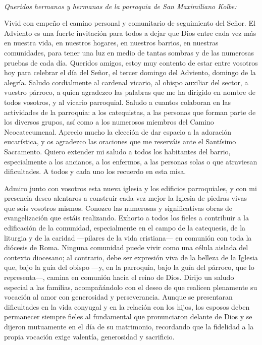 ~

\emph{Queridos hermanos y hermanas de la parroquia de San Maximiliano Kolbe:}

Vivid con empeño el camino personal y comunitario de seguimiento del Señor. El Adviento es una fuerte invitación para todos a dejar que Dios entre cada vez más en nuestra vida, en nuestros hogares, en nuestros barrios, en nuestras comunidades, para tener una luz en medio de tantas sombras y de las numerosas pruebas de cada día. Queridos amigos, estoy muy contento de estar entre vosotros hoy para celebrar el día del Señor, el tercer domingo del Adviento, domingo de la alegría. Saludo cordialmente al cardenal vicario, al obispo auxiliar del sector, a vuestro párroco, a quien agradezco las palabras que me ha dirigido en nombre de todos vosotros, y al vicario parroquial. Saludo a cuantos colaboran en las actividades de la parroquia: a los catequistas, a las personas que forman parte de los diversos grupos, así como a los numerosos miembros del Camino Neocatecumenal. Aprecio mucho la elección de dar espacio a la adoración eucarística, y os agradezco las oraciones que me reserváis ante el Santísimo Sacramento. Quiero extender mi saludo a todos los habitantes del barrio, especialmente a los ancianos, a los enfermos, a las personas solas o que atraviesan dificultades. A todos y cada uno los recuerdo en esta misa.

Admiro junto con vosotros esta nueva iglesia y los edificios parroquiales, y con mi presencia deseo alentaros a construir cada vez mejor la Iglesia de piedras vivas que sois vosotros mismos. Conozco las numerosas y significativas obras de evangelización que estáis realizando. Exhorto a todos los fieles a contribuir a la edificación de la comunidad, especialmente en el campo de la catequesis, de la liturgia y de la caridad ---pilares de la vida cristiana--- en comunión con toda la diócesis de Roma. Ninguna comunidad puede vivir como una célula aislada del contexto diocesano; al contrario, debe ser expresión viva de la belleza de la Iglesia que, bajo la guía del obispo ---y, en la parroquia, bajo la guía del párroco, que lo representa---, camina en comunión hacia el reino de Dios. Dirijo un saludo especial a las familias, acompañándolo con el deseo de que realicen plenamente su vocación al amor con generosidad y perseverancia. Aunque se presentaran dificultades en la vida conyugal y en la relación con los hijos, los esposos deben permanecer siempre fieles al fundamental  que pronunciaron delante de Dios y se dijeron mutuamente en el día de su matrimonio, recordando que la fidelidad a la propia vocación exige valentía, generosidad y sacrificio.

